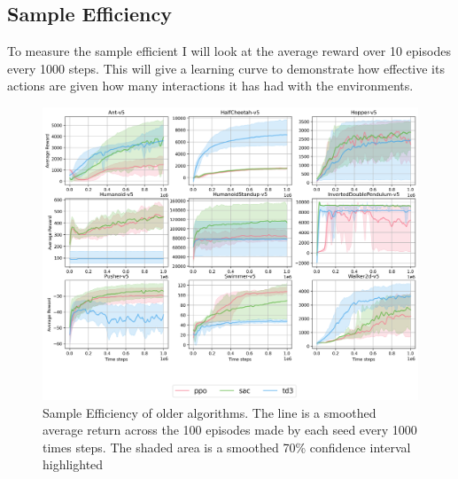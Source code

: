 \subsection{Sample Efficiency}
To measure the sample efficient I will look at the average reward over 10 episodes every 1000 steps. This will give a learning curve to demonstrate how effective its actions are given how many interactions it has had with the environments.

\begin{figure}[H]
    \centering
    \includegraphics[width=\textwidth]{figures/baseline_results.png}
    \caption{Sample Efficiency of older algorithms. The line is a smoothed average return across the 100 episodes made by each seed every 1000 times steps. The shaded area is a smoothed 70\% confidence interval highlighted}
    \label{fig:sample_efficiency_baseline}
\end{figure}

